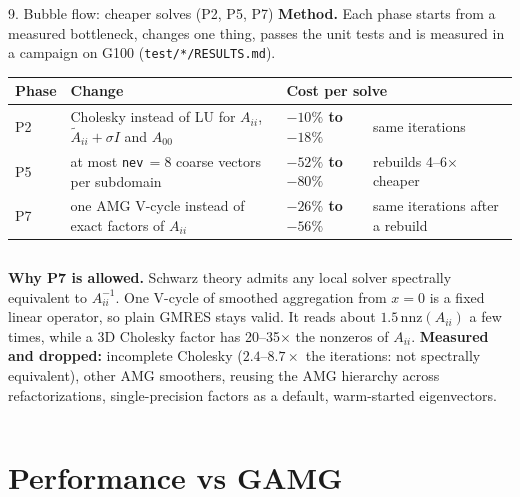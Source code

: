 \documentclass[aspectratio=169,10pt]{beamer}
\newcommand{\code}[1]{\texttt{#1}}
\newcommand{\good}[1]{{\color{schwarz!85!black}\textbf{#1}}}
\begin{document}
\begin{frame}{9. Bubble flow: cheaper solves (P2, P5, P7)}
  \small
  \textbf{\color{schwarz}Method.} Each phase starts from a measured bottleneck, changes one thing, passes
  the unit tests and is measured in a campaign on G100 (\code{test/*/RESULTS.md}).
  \begin{center}
  \footnotesize\setlength{\tabcolsep}{5pt}
  \begin{tabular}{@{}llll@{}}
    \toprule
    Phase & Change & \multicolumn{2}{l}{Cost per solve}\\
    \midrule
    P2 & Cholesky instead of LU for $A_{ii}$, $\widetilde A_{ii}+\sigma I$ and $A_{00}$ & \good{$-10\%$ to $-18\%$} & same iterations\\
    \addlinespace[2pt]
    P5 & at most \texttt{nev}$\,=8$ coarse vectors per subdomain & \good{$-52\%$ to $-80\%$} & rebuilds 4--6$\times$ cheaper\\
    \addlinespace[2pt]
    P7 & one AMG V-cycle instead of exact factors of $A_{ii}$ & \good{$-26\%$ to $-56\%$} & same iterations after a rebuild\\
    \bottomrule
  \end{tabular}
  \end{center}
  \vspace{1mm}
  \begin{columns}[T,onlytextwidth]
    \footnotesize
    \textbf{\color{schwarz}Why P7 is allowed.} Schwarz theory admits any local solver
    \alert{spectrally equivalent} to $A_{ii}^{-1}$. One V-cycle of smoothed aggregation from $x=0$ is a
    fixed linear operator, so plain GMRES stays valid. It reads about $1.5\,\mathrm{nnz}(A_{ii})$ a few
    times, while a 3D Cholesky factor has 20--35$\times$ the nonzeros of $A_{ii}$.
    \footnotesize
    \textbf{\color{schwarz}Measured and dropped:} incomplete Cholesky ($2.4$--$8.7\times$ the
    iterations: not spectrally equivalent), other AMG smoothers, reusing the AMG hierarchy across
    refactorizations, single-precision factors as a default, warm-started eigenvectors.
  \end{columns}
\end{frame}

\section{Performance vs GAMG}
\end{document}

